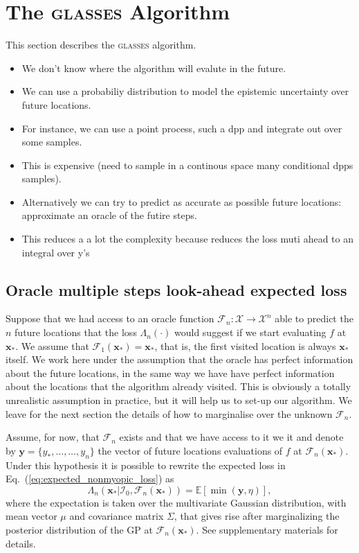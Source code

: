 \documentclass[twoside]{article}
\newcommand{\I}{\mathcal{I}}
\newcommand{\E}{\mathbb{E}}
\newcommand{\bx}{\textbf{x}}
\newcommand{\by}{\textbf{y}}
\newcommand{\future}{\mathcal{F}}
\newcommand{\acr}[1]{\textsc{#1}\xspace}
\newcommand{\us}{\acr{glasses}}
\begin{document}
 \section{The \us Algorithm}\label{sec:glasses}

This section describes the \us algorithm. 

\begin{itemize}
\item We don't know where the algorithm will evalute in the future.
\item We can use a probabiliy distribution to model the epistemic uncertainty over future locations.
\item For instance, we can use a point process, such a dpp and integrate out over some samples.
\item This is expensive (need to sample in a continous space  many conditional dpps samples).
\item Alternatively we can try to predict as accurate as possible future locations: approximate an oracle of the futire steps. 
\item This reduces a a lot the complexity because reduces the loss muti ahead to an integral over y's
\end{itemize}

\subsection{Oracle multiple steps look-ahead expected loss}
Suppose that  we had access to an oracle function $\future_{n}: {\mathcal X}\rightarrow  {\mathcal X}^n$ able to predict the $n$ future  locations that the loss $\Lambda_n(\cdot)$ would suggest if we start evaluating $f$ at $\bx_*$. We assume that $\future_{1}(\bx_*)=\bx_*$, that is, the first visited location is always $\bx_*$ itself. We work here under the assumption that the oracle has perfect information about the future locations, in the same way we have have perfect information about the locations that the algorithm already visited. This is obviously a totally unrealistic assumption in practice, but it will help us to set-up our algorithm. We leave for the next section the details of how to marginalise over the unknown $\future_{n}$. 

Assume, for now, that $\future_{n}$ exists and that we have access to it we it and denote by $\by=\{y_*,\dots,\dots,y_n\}$ the vector of future locations evaluations of $f$ at $\future_n(\bx_*)$.  Under this hypothesis it is possible to rewrite the expected loss in Eq.~(\ref{eq:expected_nonmyopic_loss}) as
\begin{equation}\label{eq:oracle_expected_nonmyopic_loss}
\Lambda_n(\bx_*|\I_0, \future_{n}(\bx_*) ) = \E [\min (\by,\eta)], 
\end{equation}
where the expectation is taken over the multivariate Gaussian distribution, with mean vector $\mu$ and covariance matrix $\Sigma$, that gives rise after marginalizing the posterior distribution of the GP at $\future_{n}(\bx_*)$. See supplementary materials for details.
\end{document}
